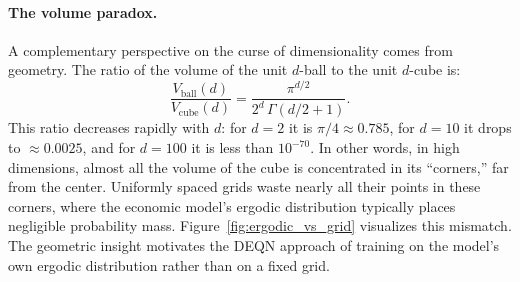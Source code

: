\documentclass[11pt,a4paper]{report}
\begin{document}
\paragraph{The volume paradox.}  A complementary perspective on the curse of dimensionality comes from geometry.  The ratio of the volume of the unit $d$-ball to the unit $d$-cube is:
\begin{equation}
\frac{V_\mathrm{ball}(d)}{V_\mathrm{cube}(d)} = \frac{\pi^{d/2}}{2^d\,\Gamma(d/2+1)}.
\end{equation}
This ratio decreases rapidly with $d$: for $d=2$ it is $\pi/4 \approx 0.785$, for $d=10$ it drops to $\approx 0.0025$, and for $d=100$ it is less than $10^{-70}$.  In other words, in high dimensions, almost all the volume of the cube is concentrated in its ``corners,'' far from the center.  Uniformly spaced grids waste nearly all their points in these corners, where the economic model's ergodic distribution typically places negligible probability mass.  Figure~\ref{fig:ergodic_vs_grid} visualizes this mismatch.  The geometric insight motivates the DEQN approach of training on the model's own ergodic distribution rather than on a fixed grid.
\end{document}
